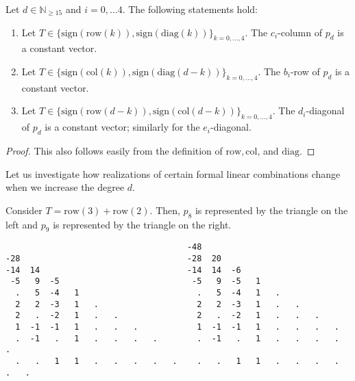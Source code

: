   \begin{proposition}
    Let \( d \in \mathbb{N}_{\geq 15} \) and \( i = 0, \dots 4 \).
    The following statements hold:
    \begin{enumerate}
    \item Let $T \in \{\mathrm{sign}(\mathrm{row}(k)), \mathrm{sign}(\mathrm{diag}(k)) \}_{k = 0, \dots, 4}$. The $c_{i}$-column of $p_d$ is a constant vector. 
  
    \item Let $T \in \{\mathrm{sign}( \mathrm{col}(k)),\mathrm{sign}(\mathrm{diag}(d-k)) \}_{k = 0, \dots, 4}$. The $b_{i}$-row of $p_d$ is a constant vector. 
  
    \item Let $T \in \{ \mathrm{sign}(\mathrm{row}(d-k)), \mathrm{sign}(\mathrm{col}(d-k)) \}_{k = 0, \dots, 4}$. The $d_{i}$-diagonal of $p_d$ is a constant vector; similarly for the $e_{i}$-diagonal. 
    \end{enumerate}
  \end{proposition}
  
  \begin{proof}
    This also follows easily from the definition of $\mathrm{row}, \mathrm{col}$, and \(\mathrm{diag} \). 
  \end{proof}
  

  Let us investigate how realizations of certain formal linear combinations change when we increase the degree \( d \). 

  
  \pagebreak

  \begin{example}
    Consider \( T = \mathrm{row}(3) + \mathrm{row}(2) \). Then, \( p_8 \) is represented by the triangle on the left and \( p_9 \) is represented by the triangle on the right.
    \begin{verbatim}
                                     -48
-28                                  -28  20
-14  14                              -14  14  -6
 -5   9  -5                           -5   9  -5   1
  .   5  -4   1                        .   5  -4   1   . 
  2   2  -3   1   .                    2   2  -3   1   .   .
  2   .  -2   1   .   .                2   .  -2   1   .   .   .
  1  -1  -1   1   .   .   .            1  -1  -1   1   .   .   .   .
  .  -1   .   1   .   .   .   .        .  -1   .   1   .   .   .   .   .
  .   .   1   1   .   .   .   .   .    .   .   1   1   .   .   .   .   .   .
    \end{verbatim}
  \end{example}


